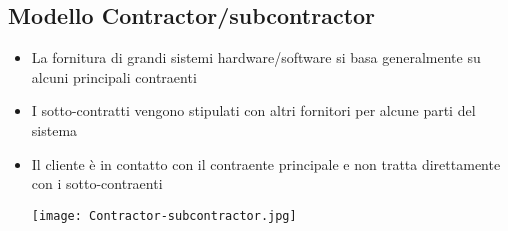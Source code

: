 \subsection{Modello Contractor/subcontractor}
\begin{itemize}
    \item La fornitura di grandi sistemi hardware/software si basa generalmente su alcuni principali contraenti
    \item I sotto-contratti vengono stipulati con altri fornitori per alcune parti del sistema
    \item Il cliente è in contatto con il contraente principale e non tratta direttamente con i sotto-contraenti
    
    \texttt{[image: Contractor-subcontractor.jpg]}
\end{itemize}